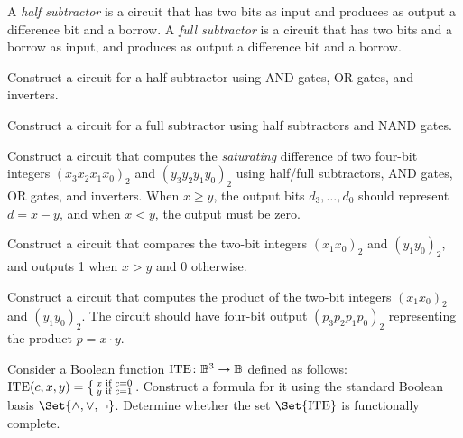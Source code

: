\documentclass[a4paper,12pt]{article}
\newenvironment{smallcases}{%
    \bigl\lbrace\begin{smallmatrix}%
}{%
    \end{smallmatrix}%
}
\begin{document}
\begin{tasks}
    \item A \textit{half subtractor} is a circuit that has two bits as input and produces as output a difference bit and a borrow. A \textit{full subtractor} is a circuit that has two bits and a borrow as input, and produces as output a difference bit and a borrow.

    \begin{subtasks}
        \item Construct a circuit for a half subtractor using AND gates, OR gates, and inverters.

        \item Construct a circuit for a full subtractor using half subtractors and NAND gates.

        \item Construct a circuit that computes the \textit{saturating} difference of two four-bit integers $(x_3 x_2 x_1 x_0)_2$ and $(y_3 y_2 y_1 y_0)_2$ using half/full subtractors, AND gates, OR gates, and inverters.
        When $x \geq y$, the output bits $d_3, \dots, d_0$ should represent $d = x - y$, and when $x < y$, the output must be zero.
    \end{subtasks}


    \item Construct a circuit that compares the two-bit integers $(x_1 x_0)_2$ and $(y_1 y_0)_2$, and outputs 1 when $x > y$ and 0 otherwise.


    \item Construct a circuit that computes the product of the two-bit integers $(x_1 x_0)_2$ and $(y_1 y_0)_2$.
    The circuit should have four-bit output $(p_3 p_2 p_1 p_0)_2$ representing the product $ p = x \cdot y$.




    \item Consider a Boolean function $\operatorname{ITE} \colon \mathbb{B}^3 \to \mathbb{B}$ defined as follows:
    $\operatorname{ITE}(c,x,y) = \begin{smallcases}
        x & \text{if } c = 0 \\
        y & \text{if } c = 1
    \end{smallcases}$.
    Construct a formula for it using the standard Boolean basis $\Set{\land, \lor, \neg}$.
    Determine whether the set $\Set{\operatorname{ITE}}$ is functionally complete.



\end{tasks}
\end{document}
